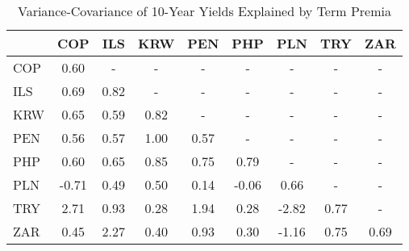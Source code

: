 \begin{scriptsize}\begin{table}\centering\begin{tabular}{l|cccccccc}\toprule & COP & ILS & KRW & PEN & PHP & PLN & TRY & ZAR \\\midrule COP & 0.60 & - & - & - & - & - & - & - \\ILS & 0.69 & 0.82 & - & - & - & - & - & - \\KRW & 0.65 & 0.59 & 0.82 & - & - & - & - & - \\PEN & 0.56 & 0.57 & 1.00 & 0.57 & - & - & - & - \\PHP & 0.60 & 0.65 & 0.85 & 0.75 & 0.79 & - & - & - \\PLN & -0.71 & 0.49 & 0.50 & 0.14 & -0.06 & 0.66 & - & - \\TRY & 2.71 & 0.93 & 0.28 & 1.94 & 0.28 & -2.82 & 0.77 & - \\ZAR & 0.45 & 2.27 & 0.40 & 0.93 & 0.30 & -1.16 & 0.75 & 0.69 \\\bottomrule\end{tabular}\caption{Variance-Covariance of 10-Year Yields Explained by Term Premia}\label{tab:temp_covshares}\end{table}\end{scriptsize}
